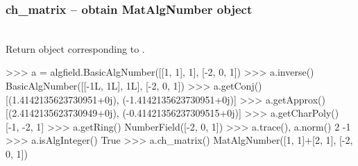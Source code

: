   \subsubsection{ch\_matrix -- obtain MatAlgNumber object}
  \\
  \spacing
  \quad Return  object corresponding to . \\
%
\begin{ex}
>>> a = algfield.BasicAlgNumber([[1, 1], 1], [-2, 0, 1])
>>> a.inverse()
BasicAlgNumber([[-1L, 1L], 1L], [-2, 0, 1])
>>> a.getConj()
[(1.4142135623730951+0j), (-1.4142135623730951+0j)]
>>> a.getApprox()
[(2.4142135623730949+0j), (-0.41421356237309515+0j)]
>>> a.getCharPoly()
[-1, -2, 1]
>>> a.getRing()
NumberField([-2, 0, 1])
>>> a.trace(), a.norm()
2 -1
>>> a.isAlgInteger()
True
>>> a.ch_matrix()
MatAlgNumber([1, 1]+[2, 1], [-2, 0, 1])
\end{ex}%
\C
